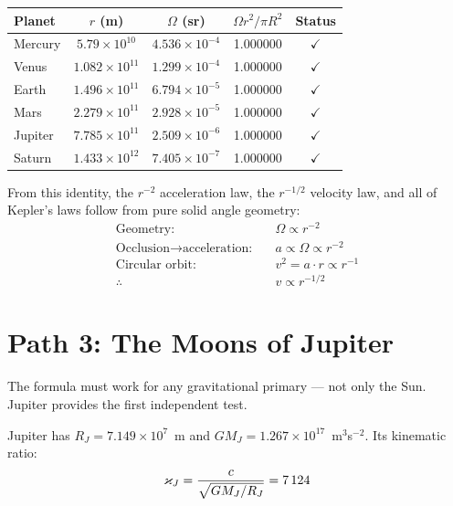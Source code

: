 \begin{center}
\small
\begin{tabular}{lcccc}
\toprule
\textbf{Planet} & $r$ (m) & $\Omega$ (sr) & $\Omega r^2 / \pi R^2$ & Status \\
\midrule
Mercury   & $5.79 \times 10^{10}$  & $4.536 \times 10^{-4}$  & 1.000000 & $\checkmark$ \\
Venus     & $1.082 \times 10^{11}$ & $1.299 \times 10^{-4}$  & 1.000000 & $\checkmark$ \\
Earth     & $1.496 \times 10^{11}$ & $6.794 \times 10^{-5}$  & 1.000000 & $\checkmark$ \\
Mars      & $2.279 \times 10^{11}$ & $2.928 \times 10^{-5}$  & 1.000000 & $\checkmark$ \\
Jupiter   & $7.785 \times 10^{11}$ & $2.509 \times 10^{-6}$  & 1.000000 & $\checkmark$ \\
Saturn    & $1.433 \times 10^{12}$ & $7.405 \times 10^{-7}$  & 1.000000 & $\checkmark$ \\
\bottomrule
\end{tabular}
\end{center}

From this identity, the $r^{-2}$ acceleration law, the $r^{-1/2}$ velocity law, and all of Kepler's laws follow from pure solid angle geometry:
\begin{align}
  \text{Geometry:}       &\quad \Omega \propto r^{-2} \\
  \text{Occlusion} \to \text{acceleration:} &\quad a \propto \Omega \propto r^{-2} \\
  \text{Circular orbit:} &\quad v^2 = a \cdot r \propto r^{-1} \\
  \therefore\quad        &\quad v \propto r^{-1/2}
\end{align}


\section{Path 3: The Moons of Jupiter}
\label{sec:path3}

The formula must work for any gravitational primary --- not only the Sun.  Jupiter provides the first independent test.

Jupiter has $R_J = 7.149 \times 10^7$~m and $GM_J = 1.267 \times 10^{17}$~m$^3$s$^{-2}$.  Its kinematic ratio:
\begin{equation}
  \varkappa_J = \frac{c}{\sqrt{GM_J/R_J}} = 7\,124
\end{equation}

